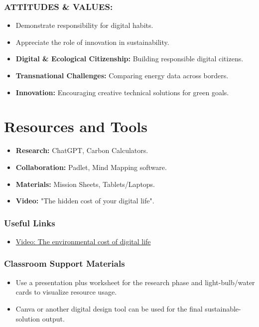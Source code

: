 \documentclass[11pt, a4paper]{article}
\begin{document}
\subsubsection*{ATTITUDES \& VALUES:}
\begin{itemize}
    \item Demonstrate responsibility for digital habits.
    \item Appreciate the role of innovation in sustainability.
\end{itemize}

\begin{eurobox}
\begin{itemize}
    \item \textbf{Digital \& Ecological Citizenship:} Building responsible digital citizens.
    \item \textbf{Transnational Challenges:} Comparing energy data across borders.
    \item \textbf{Innovation:} Encouraging creative technical solutions for green goals.
\end{itemize}
\end{eurobox}

\newpage
\section{Resources and Tools}
\begin{itemize}
    \item \textbf{Research:} ChatGPT, Carbon Calculators.
    \item \textbf{Collaboration:} Padlet, Mind Mapping software.
    \item \textbf{Materials:} Mission Sheets, Tablets/Laptops.
    \item \textbf{Video:} "The hidden cost of your digital life".
\end{itemize}

\subsubsection*{Useful Links}
\begin{itemize}
    \item \href{https://www.youtube.com/watch?v=-sNKfRq1oKg}{Video: The environmental cost of digital life}
\end{itemize}

\subsubsection*{Classroom Support Materials}
\begin{itemize}
    \item Use a presentation plus worksheet for the research phase and light-bulb/water cards to visualize resource usage.
    \item Canva or another digital design tool can be used for the final sustainable-solution output.
\end{itemize}
\end{document}
